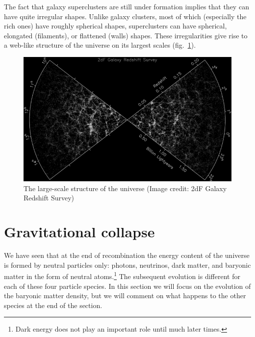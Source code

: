 The fact that galaxy superclusters are still under formation implies that they can have quite irregular shapes. Unlike galaxy clusters, most of which (especially the rich ones) have roughly spherical shapes, superclusters can have spherical, elongated (filaments), or flattened (walls) shapes. These irregularities give rise to a web-like structure of the universe on its largest scales (fig.\ \ref{fig:lec8_2}).
\begin{figure}[ht]
\begin{center}
\includegraphics[scale=0.4]{Draw/lec8_2.png}
\end{center}
\caption{The large-scale structure of the universe (Image credit: 2dF Galaxy Redshift Survey)}
\label{fig:lec8_2}
\end{figure}


\section{Gravitational collapse}

We have seen that at the end of recombination the energy content of the universe is formed by neutral particles only: photons, neutrinos, dark matter, and baryonic matter in the form of neutral atoms.\footnote{Dark energy does not play an important role until much later times.} The subsequent evolution is different for each of these four particle species. In this section we will focus on the evolution of the baryonic matter density, but we will comment on what happens to the other species at the end of the section.

